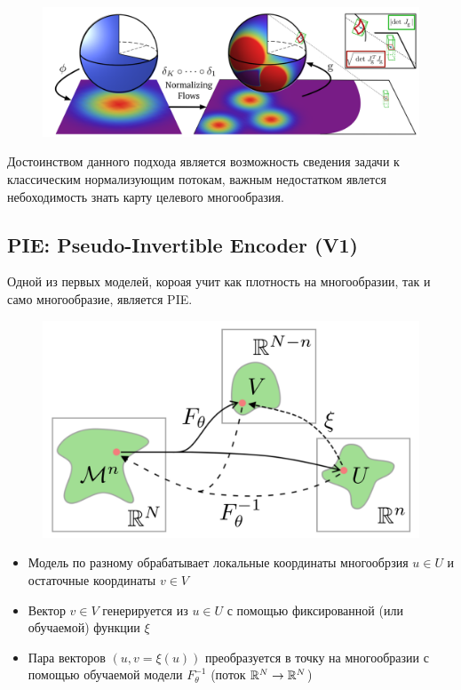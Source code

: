 \begin{figure}[h]
    \centering
    \hspace*{-5mm}\includegraphics[width=0.7\linewidth]{chapters/petr_mokrov_s1/figs/fom_final.png}
\end{figure}

Достоинством данного подхода является возможность сведения задачи к классическим нормализующим потокам, важным недостатком явлется небоходимость знать карту целевого многообразия.

\newpage

\subsection{PIE: Pseudo-Invertible Encoder (V1)}

Одной из первых моделей, короая учит как плотность на многообразии, так и само многообразие, является PIE. 

\begin{figure}[h]
    \centering
    \includegraphics[width=0.5\linewidth]{chapters/petr_mokrov_s1/figs/pie_v1_final3.png}
\end{figure}

\begin{itemize}
    \item Модель по разному обрабатывает локальные координаты многообрзия $u \in U$ и остаточные координаты $v \in V$
    \item Вектор $v \in V$ генерируется из $u \in U$ с помощью фиксированной (или обучаемой) функции $\xi$
    \item Пара векторов $(u, v = \xi(u))$ преобразуется в точку на многообразии с помощью обучаемой модели $F_{\theta}^{-1}$ (поток $\mathbb{R}^N \rightarrow \mathbb{R}^N$)
\end{itemize}

